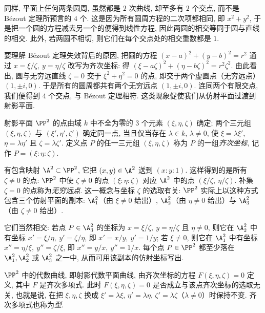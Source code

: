 同样, 平面上任何两条圆周, 虽然都是 $2$ 次曲线, 却至多有 $2$ 个交点, 而不是 Bézout 定理所预言的 $4$ 个. 这是因为所有圆周方程的二次项都相同, 即 $x^2 + y^2$, 于是把一个圆的方程减去另一个的便得到线性方程, 因此两圆的相交等同于圆与直线的相交. 此外, 若两圆不相切, 则它们在每个交点处的相交重数都是 $1$.

要理解 Bézout 定理失效背后的原因, 把圆的方程 $(x-a)^2 + (y-b)^2 = r^2$ 通过 $x = \xi/\zeta,\ y = \eta/\zeta$ 改写为齐次坐标: 得 $(\xi - a\zeta)^2 + (\eta - b\zeta)^2 = r^2 \zeta^2$. 由此看出, 圆与无穷远直线 $\zeta = 0$ 交于 $\xi^2 + \eta^2 = 0$ 的点, 即交于两个虚圆点（无穷远点）$(1, \pm i, 0)$. 于是所有的圆周都共有两个无穷远点 $(1, \pm i, 0)$. 连同两个有限交点, 我们便得到 $4$ 个交点, 与 Bézout 定理相符. 这类现象促使我们从仿射平面过渡到射影平面.

\begin{definition}[射影平面与齐次坐标]\label{def:projective-plane}
	射影平面 $\PP^2$ 的点由域 $k$ 中不全为零的 $3$ 个元素 $(\xi, \eta, \zeta)$ 确定; 两个三元组 $(\xi, \eta, \zeta)$ 与 $(\xi', \eta', \zeta')$ 确定同一点, 当且仅当存在 $\lambda \in k$, $\lambda \ne 0$, 使 $\xi = \lambda\xi'$, $\eta = \lambda\eta'$ 且 $\zeta = \lambda\zeta'$. 定义点 $P$ 的任一三元组 $(\xi, \eta, \zeta)$ 称为 $P$ 的一组\emph{齐次坐标}, 记作 $P = (\xi : \eta : \zeta)$.
\end{definition}

有包含映射 $\A^2 \subset \PP^2$, 它把 $(x, y) \in \A^2$ 送到 $(x : y : 1)$. 这样得到的是所有 $\zeta \ne 0$ 的点: $\PP^2$ 中使 $\zeta \ne 0$ 的点 $(\xi : \eta : \zeta)$ 对应 $\A^2$ 中的点 $(\xi/\zeta,\ \eta/\zeta)$. 补集 $\zeta = 0$ 的点称为\emph{无穷远点}. 这一概念与坐标 $\zeta$ 的选取有关: $\PP^2$ 实际上以这种方式包含三个仿射平面的副本: $\A^2_1$（由 $\xi \ne 0$ 给出）, $\A^2_2$（由 $\eta \ne 0$ 给出）与 $\A^2_3$（由 $\zeta \ne 0$ 给出）.

它们当然相交: 若点 $P \in \A^2_3$ 的坐标为 $x = \xi/\zeta,\ y = \eta/\zeta$ 且 $\eta \ne 0$, 则它在 $\A^2_2$ 中有坐标 $x' = \xi/\eta,\ y' = \zeta/\eta$, 即 $x' = x/y,\ y' = 1/y$; 若 $\xi \ne 0$, 则它在 $\A^2_1$ 中有坐标 $x'' = \eta/\xi,\ y'' = \zeta/\xi$, 即 $x'' = y/x,\ y'' = 1/x$. 每个点 $P \in \PP^2$ 都至少落在 $\A^2_1, \A^2_2$ 或 $\A^2_3$ 之一中, 从而可用该副本的仿射坐标写出.

\begin{definition}[射影平面曲线]\label{def:projective-curve}
	$\PP^2$ 中的代数曲线, 即射影代数平面曲线, 由齐次坐标的方程 $F(\xi, \eta, \zeta) = 0$ 定义, 其中 $F$ 是齐次多项式. 此时 $F(\xi,\eta,\zeta) = 0$ 是否成立与该点齐次坐标的选取无关, 也就是说, 在把 $\xi, \eta, \zeta$ 换成 $\xi' = \lambda\xi$, $\eta' = \lambda\eta$, $\zeta' = \lambda\zeta$（$\lambda \ne 0$）时保持不变. 齐次多项式也称为\emph{型}.
\end{definition}

